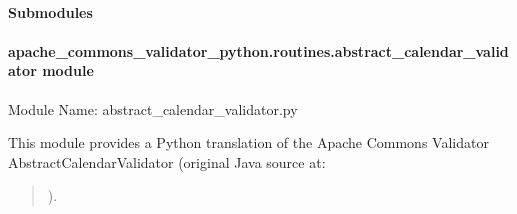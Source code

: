\documentclass[letterpaper,10pt,english]{sphinxmanual}
\begin{document}
\paragraph{Submodules}
\label{\detokenize{apache_commons_validator_python.routines:submodules}}

\paragraph{apache\_commons\_validator\_python.routines.abstract\_calendar\_validator module}
\label{\detokenize{apache_commons_validator_python.routines:module-apache_commons_validator_python.routines.abstract_calendar_validator}}\label{\detokenize{apache_commons_validator_python.routines:apache-commons-validator-python-routines-abstract-calendar-validator-module}}
\sphinxAtStartPar
Module Name: abstract\_calendar\_validator.py
\begin{description}
\sphinxAtStartPar
This module provides a Python translation of the Apache Commons Validator
AbstractCalendarValidator (original Java source at:
\begin{quote}

\sphinxAtStartPar
{}).
\end{quote}

\end{description}
\end{document}
